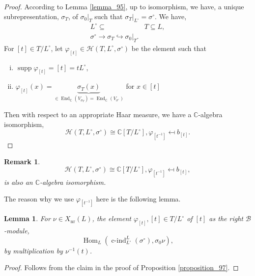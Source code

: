 \documentclass[8pt]{article}
\newtheorem{lemma}{Lemma}[section]
\newtheorem{remark}{Remark}[section]
\DeclareMathOperator{\cind}{c-ind}
\DeclareMathOperator{\Hom}{Hom}
\DeclareMathOperator{\End}{End}
\DeclareMathOperator{\supp}{supp}
\DeclareMathOperator{\nr}{nr}
\newcommand{\C}[0]{\mathbb{C}}
\newcommand{\hecke}[0]{\mathscr{H}}
\newcommand{\cB}{\mathcal{B}}
\begin{document}
\begin{proof}
  According to Lemma \ref{lemma_95}, up to isomorphism, we have, a unique subrepresentation, $\sigma_T$, of $\sigma_0|_{T}$ such that $\sigma_T|_{L^\circ} = \sigma^\circ$. We have,
  \begin{align*}
    L^\circ\subseteq & T\subseteq L,\\
    \sigma^\circ \to \sigma_T\hookrightarrow \sigma_0|_T.
  \end{align*}
  For $[t]\in T/L^\circ$, let $\varphi_{[t]}\in\hecke(T,L^\circ,\sigma^\circ)$ be the element such that 
  \begin{enumerate}[i).]
    \item $\supp\varphi_{[t]}=[t]=tL^\circ$,
    \item $\varphi_{[t]}(x) = \underbrace{\sigma_T(x)}_{\in\End_\C(V_{\sigma_T})=\End_\C(V_{\sigma^\circ})}$ for $x\in[t]$
  \end{enumerate}
  Then with respect to an appropriate Haar measure, we have a $\C$-algebra isomorphism,
  \begin{equation*}
    \hecke(T,L^\circ,\sigma^\circ)\cong \C[T/L^\circ], \varphi_{[t^{-1}]}\mapsfrom b_{[t]}.
  \end{equation*}
\end{proof}

\begin{remark}
  \begin{equation*}
    \hecke(T,L^\circ,\sigma^\circ)\cong\C[T/L^\circ], \varphi_{[t^{-1}]}\mapsfrom b_{[t]},
  \end{equation*}
  is also an $\C$-algebra isomorphism.
\end{remark}
 The reason why we use $\varphi_{[t^{-1}]}$ here is the following lemma.
\begin{lemma}
  For $\nu\in X_{\nr}(L)$, the element $\varphi_{[t]},[t]\in T/L^\circ$ of $[t]$ as the right $\cB$-module, 
  \begin{equation*}
  \Hom_L(\cind_{L^\circ}^L(\sigma^\circ),\sigma_0\nu),
  \end{equation*}
  by multiplication by $\nu^{-1}(t)$. 
  \label{lemma_111}
\end{lemma}

\begin{proof}
  Follows from the claim in the proof of Proposition \ref{proposition_97}.
\end{proof}
\end{document}
